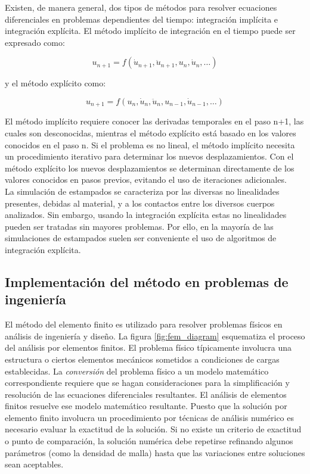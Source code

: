 Existen, de manera general, dos tipos de métodos para resolver ecuaciones diferenciales  
en problemas dependientes del tiempo: integración implícita e integración explícita. El 
método implícito de integración en el tiempo puede ser expresado como: ~\cite{nielsen1997}

\begin{equation}
u_{n+1}=f(\dot{u}_{n+1},\ddot{u}_{n+1},u_n,\dot{u}_n,…)
\end{equation}

y el método explícito como:

\begin{equation}
u_{n+1}=f(u_n,\dot{u}_n,\ddot{u}_n,u_{n-1},\dot{u}_{n-1},…)
\end{equation}

El método implícito requiere conocer las derivadas temporales en el paso n+1, las cuales son desconocidas, 
mientras el método explícito está basado en los valores conocidos en el paso n. Si el problema es no 
lineal, el método implícito necesita un procedimiento iterativo para determinar los nuevos desplazamientos. 
Con el método explícito los nuevos desplazamientos se determinan directamente de los valores conocidos 
en pasos previos, evitando el uso de iteraciones adicionales.~\cite{nielsen1997}\\

La simulación de estampados se caracteriza por las diversas no linealidades presentes, debidas al 
material, y a los contactos entre los diversos cuerpos analizados. Sin embargo, usando la integración 
explícita estas no linealidades pueden ser tratadas sin mayores problemas. Por ello, en la mayoría de 
las simulaciones de estampados suelen ser conveniente el uso de algoritmos de integración explícita.


\subsection{Implementación del método en problemas de ingeniería}

El método del elemento finito es utilizado para resolver problemas físicos en análisis de ingeniería 
y diseño. La figura \ref{fig:fem_diagram} esquematiza el proceso del análisis por elementos finitos.
El problema físico típicamente involucra una estructura o ciertos elementos mecánicos sometidos 
a condiciones de cargas establecidas. La \textit{conversión} del problema físico a un modelo matemático 
correspondiente requiere que se hagan consideraciones para la simplificación y resolución de las 
ecuaciones diferenciales resultantes. El análisis de elementos finitos resuelve ese modelo matemático 
resultante. Puesto que la solución por elemento finito involucra un procedimiento por técnicas de 
análisis numérico es necesario evaluar la exactitud de la solución. Si no existe un criterio de 
exactitud o punto de comparación, la solución numérica debe repetirse refinando algunos parámetros 
(como la densidad de malla) hasta que las variaciones entre soluciones sean aceptables.\\

